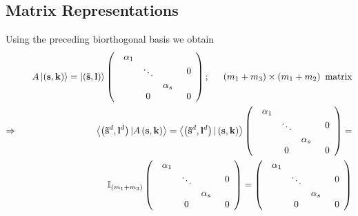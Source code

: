 \subsection{Matrix Representations}

Using the preceding biorthogonal basis we obtain 
\begin{eqnarray}
&&A\left| \left( {\bf s,k}\right) \right\rangle =\left| \left( {\bf \tilde{s}%
,l}\right) \right\rangle \left( 
\begin{array}{cc}
\begin{array}{ccc}
\alpha _{1} &  &  \\ 
& \ddots &  \\ 
&  & \alpha _{s}%
\end{array}
& 0 \\ 
0 & 0%
\end{array}%
\right) ;\quad \text{ }\left( m_{1}+m_{3}\right) \times \left(
m_{1}+m_{2}\right) \text{ matrix}  \nonumber \\
&{\Bbb \Rightarrow }&\left\langle \left( {\bf \tilde{s}}^{d},{\bf l}%
^{d}\right) |A\left( {\bf s,k}\right) \right\rangle =\left\langle \left( 
{\bf \tilde{s}}^{d},{\bf l}^{d}\right) |\left( {\bf s,k}\right)
\right\rangle \left( 
\begin{array}{cc}
\begin{array}{ccc}
\alpha _{1} &  &  \\ 
& \ddots &  \\ 
&  & \alpha _{s}%
\end{array}
& 0 \\ 
0 & 0%
\end{array}%
\right) =  \nonumber \\
&&\qquad \qquad \qquad \qquad \quad {\Bbb I}_{\left( m_{1}+m_{3}\right)
}\left( 
\begin{array}{cc}
\begin{array}{ccc}
\alpha _{1} &  &  \\ 
& \ddots &  \\ 
&  & \alpha _{s}%
\end{array}
& 0 \\ 
0 & 0%
\end{array}%
\right) =\left( 
\begin{array}{cc}
\begin{array}{ccc}
\alpha _{1} &  &  \\ 
& \ddots &  \\ 
&  & \alpha _{s}%
\end{array}
& 0 \\ 
0 & 0%
\end{array}%
\right)
\end{eqnarray}%
